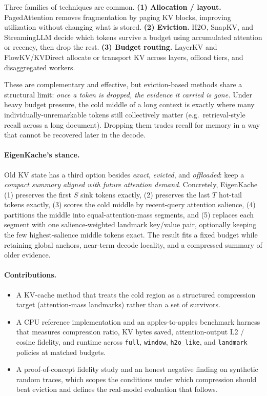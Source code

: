 \documentclass[10pt,twocolumn]{article}
\newcommand{\code}[1]{\texttt{#1}}
\begin{document}
Three families of techniques are common. \textbf{(1) Allocation / layout.}
PagedAttention removes fragmentation by paging KV blocks, improving utilization
without changing what is stored. \textbf{(2) Eviction.} H2O, SnapKV, and
StreamingLLM decide which tokens survive a budget using accumulated attention or
recency, then drop the rest. \textbf{(3) Budget routing.} LayerKV and
FlowKV/KVDirect allocate or transport KV across layers, offload tiers, and
disaggregated workers.

These are complementary and effective, but eviction-based methods share a
structural limit: \emph{once a token is dropped, the evidence it carried is
gone.} Under heavy budget pressure, the cold middle of a long context is exactly
where many individually-unremarkable tokens still collectively matter (e.g.\
retrieval-style recall across a long document). Dropping them trades recall for
memory in a way that cannot be recovered later in the decode.

\paragraph{EigenKache's stance.} Old KV state has a third option besides
\emph{exact}, \emph{evicted}, and \emph{offloaded}: keep a \emph{compact summary
aligned with future attention demand}. Concretely, EigenKache (1) preserves the
first $S$ sink tokens exactly, (2) preserves the last $T$ hot-tail tokens
exactly, (3) scores the cold middle by recent-query attention salience, (4)
partitions the middle into equal-attention-mass segments, and (5) replaces each
segment with one salience-weighted landmark key/value pair, optionally keeping
the few highest-salience middle tokens exact. The result fits a fixed budget
while retaining global anchors, near-term decode locality, and a compressed
summary of older evidence.

\paragraph{Contributions.}
\begin{itemize}
\item A KV-cache method that treats the cold region as a structured compression
target (attention-mass landmarks) rather than a set of survivors.
\item A CPU reference implementation and an apples-to-apples benchmark harness
that measures compression ratio, KV bytes saved, attention-output L2 / cosine
fidelity, and runtime across \code{full}, \code{window}, \code{h2o\_like}, and
\code{landmark} policies at matched budgets.
\item A proof-of-concept fidelity study and an honest negative finding on
synthetic random traces, which scopes the conditions under which compression
should beat eviction and defines the real-model evaluation that follows.
\end{itemize}
\end{document}
